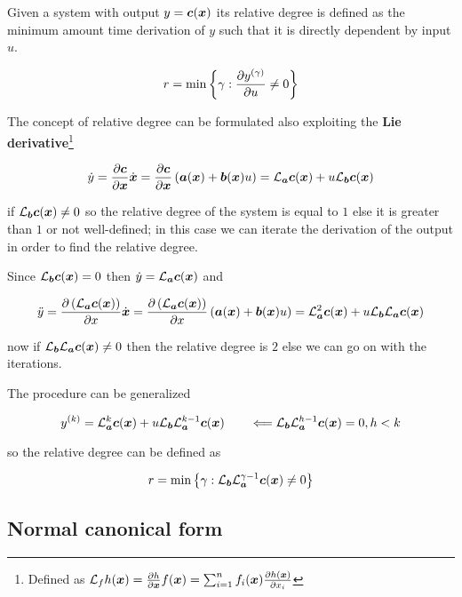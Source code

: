 Given a system with output $y=\vect c(\x)$ its relative degree is defined as the minimum amount time derivation of $y$ such that it is directly dependent by input $u$.

\[
    r = \min \left\{ \gamma : \pdiff{y^{(\gamma)}}{u} \neq 0 \right\}
\]

The concept of relative degree can be formulated also exploiting the \textbf{Lie derivative}\footnote{Defined as $\Lie{f} h(\x) = \pdiff{h}{\x} f(\x) = \sum_{i=1}^{n} f_i(\x) \pdiff{h(\x)}{x_i}$}

\[
    \dot y =
    \pdiff{\vect c}{\x} \dx =
    \pdiff{\vect c}{\x} \left(\vect a(\x) + \vect b(\x) u\right) =
    \Lie{\vect a} \vect c(\x) + u \Lie{\vect b} \vect c(\x)
\]

if $\Lie{\vect b} \vect c(\x) \neq 0$ so the relative degree of the system is equal to $1$ else it is greater than $1$ or not well-defined;
in this case we can iterate the derivation of the output in order to find the relative degree.

Since $\Lie{\vect b} \vect c(\x) = 0$ then $\dot y = \Lie{\vect a} \vect c(\x)$ and

\[
    \ddot y =
    \pdiff{\left( \Lie{\vect a} \vect c(\x) \right)}{x} \dx =
    \pdiff{\left( \Lie{\vect a} \vect c(\x) \right)}{x} \left(\vect a(\x) + \vect b(\x) u\right) =
    \Lie{\vect a}^2 \vect c(\x) + u \Lie{\vect b} \Lie{\vect a} \vect c(\x)
\]

now if $\Lie{\vect b} \Lie{\vect a} \vect c(\x) \neq 0$ then the relative degree is $2$ else we can go on with the iterations.

The procedure can be generalized

\begin{equation}\label{eqn:output-via-lie}
    y^{(k)} = \Lie{\vect a}^k \vect c(\x) + u \Lie{\vect b} \Lie{\vect a}^{k-1} \vect c(\x) \qquad \Longleftarrow \Lie{\vect b} \Lie{\vect a}^{h-1} \vect c(\x) = 0, h < k
\end{equation}

so the relative degree can be defined as

\[
    r = \min \left\{ \gamma : \Lie{\vect b} \Lie{\vect a}^{\gamma-1} \vect c(\x) \neq 0 \right\}
\]

\subsection{Normal canonical form}


